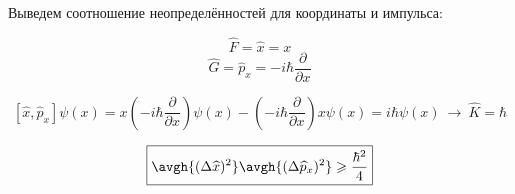 \begin{exmpl} Выведем соотношение неопределённостей для координаты и импульса:

$$\widehat{F}=\widehat{x}=x$$
$$\widehat{G}=\widehat{p}_x=-i\hbar\frac{\partial}{\partial{x}}$$

$$[\widehat{x},\widehat{p}_x]\psi(x)=x(-i\hbar\frac{\partial}{\partial{x}})\psi(x)-(-i\hbar\frac{\partial}{\partial{x}})x\psi(x)=i\hbar\psi(x)~\to~\widehat{K}=\hbar$$


$$\boxed{\avgh{(\Delta\widehat{x})^2}\avgh{(\Delta\widehat{p}_x)^2} \geqslant \frac{\hbar^2}{4}}$$
\end{exmpl}
